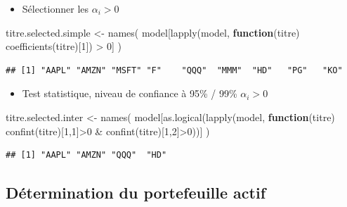 \documentclass[
]{article}
\newenvironment{Shaded}{\begin{snugshade}}{\end{snugshade}}
\newcommand{\ControlFlowTok}[1]{\textcolor[rgb]{0.13,0.29,0.53}{\textbf{#1}}}
\newcommand{\DecValTok}[1]{\textcolor[rgb]{0.00,0.00,0.81}{#1}}
\newcommand{\FunctionTok}[1]{\textcolor[rgb]{0.00,0.00,0.00}{#1}}
\newcommand{\NormalTok}[1]{#1}
\newcommand{\OtherTok}[1]{\textcolor[rgb]{0.56,0.35,0.01}{#1}}
\newcommand{\SpecialCharTok}[1]{\textcolor[rgb]{0.00,0.00,0.00}{#1}}
\providecommand{\tightlist}{%
  \setlength{\itemsep}{0pt}\setlength{\parskip}{0pt}}
\begin{document}
\begin{itemize}
\tightlist
\item
  Sélectionner les \(\alpha_{i} > 0\)
\end{itemize}

\begin{Shaded}
\begin{Highlighting}[]
\NormalTok{titre.selected.simple }\OtherTok{\textless{}{-}} \FunctionTok{names}\NormalTok{(}
\NormalTok{  model[}\FunctionTok{lapply}\NormalTok{(model, }\ControlFlowTok{function}\NormalTok{(titre) }\FunctionTok{coefficients}\NormalTok{(titre)[}\DecValTok{1}\NormalTok{]) }
  \SpecialCharTok{\textgreater{}} \DecValTok{0}\NormalTok{]}
\NormalTok{  )}
\end{Highlighting}
\end{Shaded}

\begin{verbatim}
## [1] "AAPL" "AMZN" "MSFT" "F"    "QQQ"  "MMM"  "HD"   "PG"   "KO"
\end{verbatim}

\begin{itemize}
\tightlist
\item
  Test statistique, niveau de confiance à 95\% / 99\% \(\alpha_{i} > 0\)
\end{itemize}

\begin{Shaded}
\begin{Highlighting}[]
\NormalTok{titre.selected.inter }\OtherTok{\textless{}{-}} \FunctionTok{names}\NormalTok{(}
\NormalTok{  model[}\FunctionTok{as.logical}\NormalTok{(}\FunctionTok{lapply}\NormalTok{(model,}
  \ControlFlowTok{function}\NormalTok{(titre) }\FunctionTok{confint}\NormalTok{(titre)[}\DecValTok{1}\NormalTok{,}\DecValTok{1}\NormalTok{]}\SpecialCharTok{\textgreater{}}\DecValTok{0} \SpecialCharTok{\&} \FunctionTok{confint}\NormalTok{(titre)[}\DecValTok{1}\NormalTok{,}\DecValTok{2}\NormalTok{]}\SpecialCharTok{\textgreater{}}\DecValTok{0}\NormalTok{))]}
\NormalTok{  )}
\end{Highlighting}
\end{Shaded}

\begin{verbatim}
## [1] "AAPL" "AMZN" "QQQ"  "HD"
\end{verbatim}

\hypertarget{duxe9termination-du-portefeuille-actif}{%
\subsection{Détermination du portefeuille
actif}\label{duxe9termination-du-portefeuille-actif}}
\end{document}

